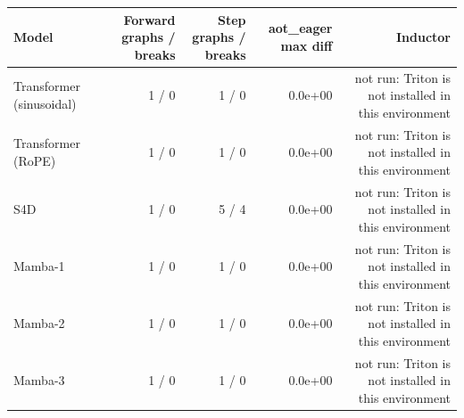 \begin{tabular}{lrrrr}
\toprule
Model & Forward graphs / breaks & Step graphs / breaks & aot\_eager max diff & Inductor \\
\midrule
Transformer (sinusoidal) & 1 / 0 & 1 / 0 & 0.0e+00 & not run: Triton is not installed in this environment \\
Transformer (RoPE) & 1 / 0 & 1 / 0 & 0.0e+00 & not run: Triton is not installed in this environment \\
S4D & 1 / 0 & 5 / 4 & 0.0e+00 & not run: Triton is not installed in this environment \\
Mamba-1 & 1 / 0 & 1 / 0 & 0.0e+00 & not run: Triton is not installed in this environment \\
Mamba-2 & 1 / 0 & 1 / 0 & 0.0e+00 & not run: Triton is not installed in this environment \\
Mamba-3 & 1 / 0 & 1 / 0 & 0.0e+00 & not run: Triton is not installed in this environment \\
\bottomrule
\end{tabular}
\par{}
